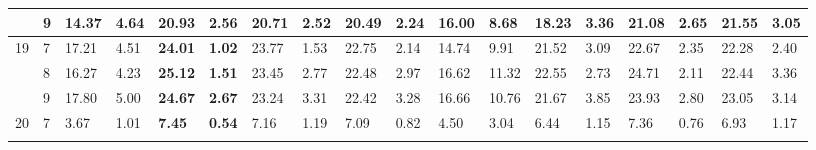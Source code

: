 \documentclass[conference]{IEEEtran}
\begin{document}
\begin{table}[]
\begin{tabular}{|cl|ll|ll|ll|ll|ll|ll|ll|ll|}
		\multicolumn{1}{|c|}{}                    & 9          & \multicolumn{1}{l|}{14.37}         & 4.64          & \multicolumn{1}{l|}{20.93}          & 2.56          & \multicolumn{1}{l|}{20.71}          & 2.52          & \multicolumn{1}{l|}{20.49}          & \textbf{2.24} & \multicolumn{1}{l|}{16.00}                & 8.68  & \multicolumn{1}{l|}{18.23} & 3.36 & \multicolumn{1}{l|}{21.08}          & 2.65          & \multicolumn{1}{l|}{\textbf{21.55}} & 3.05          \\ \hline
		\multicolumn{1}{|c|}{\multirow{3}{*}{19}} & 7          & \multicolumn{1}{l|}{17.21}         & 4.51          & \multicolumn{1}{l|}{\textbf{24.01}} & \textbf{1.02} & \multicolumn{1}{l|}{23.77}          & 1.53          & \multicolumn{1}{l|}{22.75}          & 2.14          & \multicolumn{1}{l|}{14.74}                & 9.91  & \multicolumn{1}{l|}{21.52} & 3.09 & \multicolumn{1}{l|}{22.67}          & 2.35          & \multicolumn{1}{l|}{22.28}          & 2.40          \\ \cline{2-18} 
		\multicolumn{1}{|c|}{}                    & 8          & \multicolumn{1}{l|}{16.27}         & 4.23          & \multicolumn{1}{l|}{\textbf{25.12}} & \textbf{1.51} & \multicolumn{1}{l|}{23.45}          & 2.77          & \multicolumn{1}{l|}{22.48}          & 2.97          & \multicolumn{1}{l|}{16.62}                & 11.32 & \multicolumn{1}{l|}{22.55} & 2.73 & \multicolumn{1}{l|}{24.71}          & 2.11          & \multicolumn{1}{l|}{22.44}          & 3.36          \\ \cline{2-18} 
		\multicolumn{1}{|c|}{}                    & 9          & \multicolumn{1}{l|}{17.80}         & 5.00          & \multicolumn{1}{l|}{\textbf{24.67}} & \textbf{2.67} & \multicolumn{1}{l|}{23.24}          & 3.31          & \multicolumn{1}{l|}{22.42}          & 3.28          & \multicolumn{1}{l|}{16.66}                & 10.76 & \multicolumn{1}{l|}{21.67} & 3.85 & \multicolumn{1}{l|}{23.93}          & 2.80          & \multicolumn{1}{l|}{23.05}          & 3.14          \\ \hline
		\multicolumn{1}{|c|}{\multirow{3}{*}{20}} & 7          & \multicolumn{1}{l|}{3.67}          & 1.01          & \multicolumn{1}{l|}{\textbf{7.45}}  & \textbf{0.54} & \multicolumn{1}{l|}{7.16}           & 1.19          & \multicolumn{1}{l|}{7.09}           & 0.82          & \multicolumn{1}{l|}{4.50}                 & 3.04  & \multicolumn{1}{l|}{6.44}  & 1.15 & \multicolumn{1}{l|}{7.36}           & 0.76          & \multicolumn{1}{l|}{6.93}           & 1.17          \\ \cline{2-18} 

\end{tabular}
\end{table}
\end{document}
